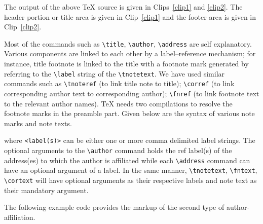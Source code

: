 \documentclass[a4paper,12pt]{article}
\begin{document}
	The output of the above TeX source is given in Clips~\ref{clip1} and
	\ref{clip2}. The header portion or title area is given in Clip~\ref{clip1} and
	the footer area is given in Clip~\ref{clip2}.
	
	\vspace*{6pt}
	\def\rulecolor{blue!70}
	\def\rulecolor{orange}
	
	\def\rulecolor{blue!70}
	\def\rulecolor{orange}
	\pagebreak
	
	Most of the commands such as \verb+\title+, \verb+\author+,
	\verb+\address+ are self explanatory.  Various components are
	linked to each other by a label--reference mechanism; for
	instance, title footnote is linked to the title with a footnote
	mark generated by referring to the \verb+\label+ string of
	the \verb=\tnotetext=.  We have used similar commands
	such as \verb=\tnoteref= (to link title note to title);
	\verb=\corref= (to link corresponding author text to
	corresponding author); \verb=\fnref= (to link footnote text to
	the relevant author names).  \TeX{} needs two compilations to
	resolve the footnote marks in the preamble part.  
	Given below are the syntax of various note marks and note texts.
	
	\begin{vquote}
	\end{vquote}
	
	\noindent where \verb=<label(s)>= can be either one or more comma
	delimited label strings. The optional arguments to the
	\verb=\author= command holds the ref label(s) of the address(es)
	to which the author is affiliated while each \verb=\address=
	command can have an optional argument of a label. In the same
	manner, \verb=\tnotetext=, \verb=\fntext=, \verb=\cortext= will
	have optional arguments as their respective labels and note text
	as their mandatory argument.
	
	The following example code provides the markup of the second type
	of author-affiliation.
	
\end{document}
